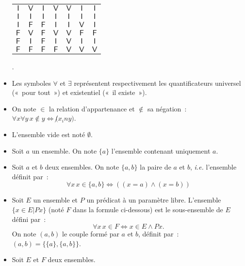 \begin{itemize}
\begin{center}
\begin{tabular}{c c | c c c c c}
    $\mathsf{I}$ & $\mathsf{V}$ & $\mathsf{I}$ & $\mathsf{V}$ & $\mathsf{V}$ & $\mathsf{I}$ & $\mathsf{I}$ \\
    $\mathsf{I}$ & $\mathsf{I}$ & $\mathsf{I}$ & $\mathsf{I}$ & $\mathsf{I}$ & $\mathsf{I}$ & $\mathsf{I}$ \\
    $\mathsf{I}$ & $\mathsf{F}$ & $\mathsf{F}$ & $\mathsf{I}$ & $\mathsf{I}$ & $\mathsf{V}$ & $\mathsf{I}$ \\
    $\mathsf{F}$ & $\mathsf{V}$ & $\mathsf{F}$ & $\mathsf{V}$ & $\mathsf{V}$ & $\mathsf{F}$ & $\mathsf{F}$ \\
    $\mathsf{F}$ & $\mathsf{I}$ & $\mathsf{F}$ & $\mathsf{I}$ & $\mathsf{V}$ & $\mathsf{I}$ & $\mathsf{I}$ \\
    $\mathsf{F}$ & $\mathsf{F}$ & $\mathsf{F}$ & $\mathsf{F}$ & $\mathsf{V}$ & $\mathsf{V}$ & $\mathsf{V}$ \\
\end{tabular} .
\end{center}
\item Les symboles $\forall$ et $\exists$ représentent respectivement les quantificateurs universel (« pour tout ») et existentiel (« il existe »). 
\item On note $\in$ la relation d'appartenance et $\notin$ sa négation : $\forall x \forall y \, x \notin y \Leftrightarrow \not (x _in y)$.
\item L'ensemble vide est noté $\emptyset$.
\item Soit $a$ un ensemble. 
    On note $\lbrace a \rbrace$ l'ensemble contenant uniquement $a$. 
\item Soit $a$ et $b$ deux ensembles.
    On note $\lbrace a, b \rbrace$ la paire de $a$ et $b$, \textit{i.e.} l'ensemble définit par : 
\begin{equation*}
    \forall x \, x \in \lbrace a, b \rbrace \Leftrightarrow ((x = a) \wedge (x = b))
\end{equation*}
\item Soit $E$ un ensemble et $P$ un prédicat à un paramètre libre. 
    L'ensemble $\lbrace x \in E \vert P x \rbrace$ (noté $F$ dans la formule ci-dessous) est le sous-ensemble de $E$ défini par : 
\begin{equation*}
    \forall x \, x \in F \Leftrightarrow x \in E \wedge P x. 
\end{equation*}
    On note $(a,b)$ le couple formé par $a$ et $b$, définit par : $(a,b) = \lbrace \lbrace a \rbrace, \lbrace a, b \rbrace \rbrace$.
\item Soit $E$ et $F$ deux ensembles. 

\end{itemize}
